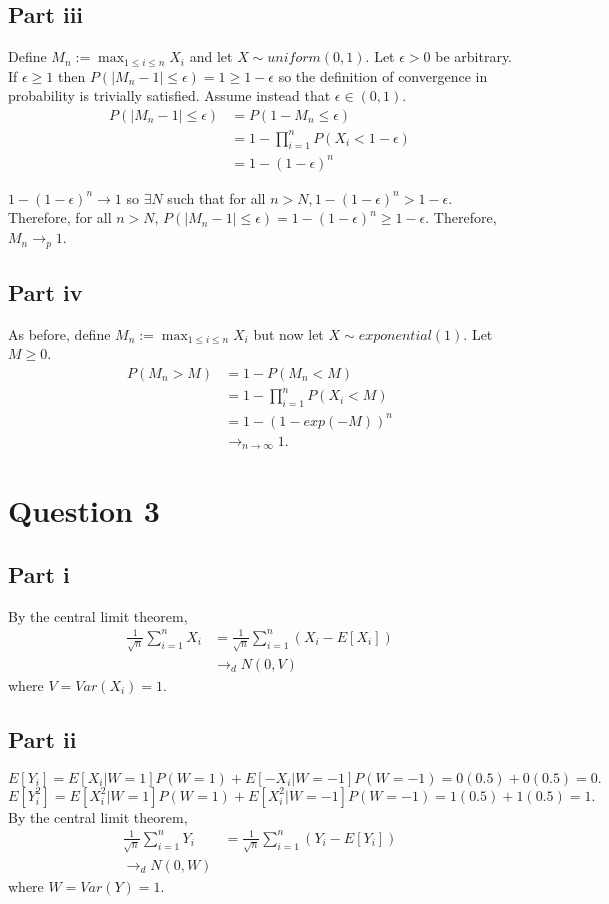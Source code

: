 \documentclass[11pt]{article} %
\begin{document}
\subsection{Part iii}
Define $M_n:= \max_{1\leq i\leq n} X_i$ and let $X\sim uniform(0,1).$ Let $\epsilon>0$ be arbitrary. If $\epsilon\geq 1$ then $P(|M_n - 1| \leq \epsilon) = 1\geq 1-\epsilon$ so the definition of convergence in probability is trivially satisfied. Assume instead that $\epsilon \in (0,1)$.
\begin{align*}
P(|M_n - 1| \leq \epsilon) &= P(1-M_n \leq \epsilon)\\
&= 1- \prod_{i=1}^n P(X_i<1-\epsilon)\\
&= 1-(1-\epsilon)^n
\end{align*}

$1-(1-\epsilon)^n\rightarrow 1$ so $\exists N$ such that for all $n>N,1-(1-\epsilon)^n > 1-\epsilon .$ Therefore, for all $n>N$, $P(|M_n - 1| \leq \epsilon) = 1-(1-\epsilon)^n \geq 1-\epsilon$. Therefore, $M_n \rightarrow_p 1$. 
\subsection{Part iv}
As before, define $M_n:= \max_{1\leq i\leq n} X_i$  but now let $X\sim exponential(1).$ Let $M \geq 0$.
\begin{align*}
P(M_n>M) &= 1-P(M_n<M)\\
&= 1-\prod_{i=1}^n P(X_i<M)\\
&= 1- (1 - exp(-M))^n \\
&\rightarrow_{n\rightarrow \infty} 1.
\end{align*}
\section{Question 3}
\subsection{Part i}
By the central limit theorem,
\begin{align*}
\frac{1}{\sqrt{n}}\sum_{i=1}^{n}X_i &= \frac{1}{\sqrt{n}}\sum_{i=1}^{n}(X_i - E[X_i])\\
&\rightarrow_d N(0,V)
\end{align*}
where $V = Var(X_i) = 1.$

\subsection{Part ii}
$E[Y_i] = E[X_i|W=1]P(W=1) +E[-X_i|W=-1]P(W=-1)  = 0(0.5) + 0(0.5) = 0.$\\
$E[Y_i^2] = E[X_i^2|W=1]P(W=1) + E[X_i^2|W=-1]P(W=-1) = 1(0.5) + 1(0.5) = 1.$
By the central limit theorem,
\begin{align*}
\frac{1}{\sqrt{n}}\sum_{i=1}^nY_i &= \frac{1}{\sqrt{n}}\sum_{i=1}^n(Y_i - E[Y_i])\\
\rightarrow_d N(0,W)
\end{align*}
where $W = Var(Y) = 1.$
\end{document}
